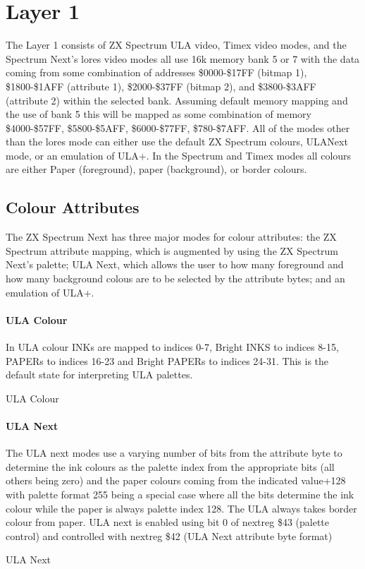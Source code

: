 \section{Layer 1}
The Layer 1 consists of ZX Spectrum ULA video, Timex video modes, and
the Spectrum Next’s lores video modes all use 16k memory bank 5 or 7
with the data coming from some combination of addresses \$0000-\$17FF
(bitmap 1), \$1800-\$1AFF (attribute 1), \$2000-\$37FF (bitmap 2), and
\$3800-\$3AFF (attribute 2) within the selected bank.  Assuming
default memory mapping and the use of bank 5 this will be mapped as
some combination of memory \$4000-\$57FF, \$5800-\$5AFF,
\$6000-\$77FF, \$780-\$7AFF. All of the modes other than the lores
mode can either use the default ZX Spectrum colours, ULANext mode, or
an emulation of ULA+. In the Spectrum and Timex modes all colours are
either Paper (foreground), paper (background), or border colours.

\subsection{Colour Attributes}
The ZX Spectrum Next has three major modes for colour attributes: the
ZX Spectrum attribute mapping, which is augmented by using the ZX
Spectrum Next's palette; ULA Next, which allows the user to how many
foreground and how many background colous are to be selected by the
attribute bytes; and an emulation of ULA+.

\paragraph{ULA Colour}
In ULA colour INKs are mapped to indices 0-7, Bright INKS to indices
8-15, PAPERs to indices 16-23 and Bright PAPERs to indices 24-31. This
is the default state for interpreting ULA palettes.
\sinset
\begin{table}[h]\centering
  \caption{ULA Colour}
\end{table}
\einset
\paragraph{ULA Next}
The ULA next modes use a varying number of bits from the attribute
byte to determine the ink colours as the palette index from the
appropriate bits (all others being zero) and the paper colours coming
from the indicated value+128 with palette format 255 being a special
case where all the bits determine the ink colour while the paper is
always palette index 128. The ULA always takes border colour from
paper. ULA next is enabled using bit 0 of nextreg \$43 (palette
control) and controlled with nextreg \$42 (ULA Next attribute byte
format)
\sinset
\begin{table}[h]\centering
  \caption{ULA Next}
\end{table}
\einset
